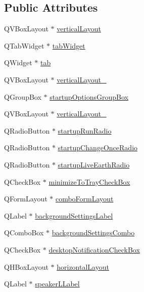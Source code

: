 \subsection*{Public Attributes}
\begin{DoxyCompactItemize}
\item 
QVBoxLayout $\ast$ \hyperlink{classUi__Preferences_a722426c9c3f286e8490cb46d018dde0f}{verticalLayout}
\item 
QTabWidget $\ast$ \hyperlink{classUi__Preferences_a4f58302cca06f93e8714c6bd88b48aa6}{tabWidget}
\item 
QWidget $\ast$ \hyperlink{classUi__Preferences_a1fe1c0c2e19204ecd2d8a61d5ae24d0c}{tab}
\item 
QVBoxLayout $\ast$ \hyperlink{classUi__Preferences_ae3127ba315cedc5477a5de16a64ac2a3}{verticalLayout\_}
\item 
QGroupBox $\ast$ \hyperlink{classUi__Preferences_a6b9f14014b45e259f04af95ab2f0bab2}{startupOptionsGroupBox}
\item 
QVBoxLayout $\ast$ \hyperlink{classUi__Preferences_a8d2ebaea31177b90094be7df939bd59b}{verticalLayout\_}
\item 
QRadioButton $\ast$ \hyperlink{classUi__Preferences_a1eb4559ebb63551ec3ebd03e1209a0c1}{startupRunRadio}
\item 
QRadioButton $\ast$ \hyperlink{classUi__Preferences_a394530273401e5624c80f0b0665a8242}{startupChangeOnceRadio}
\item 
QRadioButton $\ast$ \hyperlink{classUi__Preferences_ad4180835bda75254d45f8f6a8bde10a6}{startupLiveEarthRadio}
\item 
QCheckBox $\ast$ \hyperlink{classUi__Preferences_aa58b4ebc358d2f12989ca10837fa90ea}{minimizeToTrayCheckBox}
\item 
QFormLayout $\ast$ \hyperlink{classUi__Preferences_a5c00b5bc1658f27ec4b4e54a8cd7d934}{comboFormLayout}
\item 
QLabel $\ast$ \hyperlink{classUi__Preferences_ab99fc5d0082778ba6c0f80e6fbf14149}{backgroundSettingsLabel}
\item 
QComboBox $\ast$ \hyperlink{classUi__Preferences_a129964e10a8201a42326692ea118d4d5}{backgroundSettingsCombo}
\item 
QCheckBox $\ast$ \hyperlink{classUi__Preferences_aae955def2c42e4e1c34edf4c65004fe1}{desktopNotificationCheckBox}
\item 
QHBoxLayout $\ast$ \hyperlink{classUi__Preferences_af7c637ac0c6eb90257bbdac6024e3975}{horizontalLayout}
\item 
QLabel $\ast$ \hyperlink{classUi__Preferences_a1178f394ee8cfda62146d337d7f24b43}{speakerLLabel}

\end{DoxyCompactItemize}
